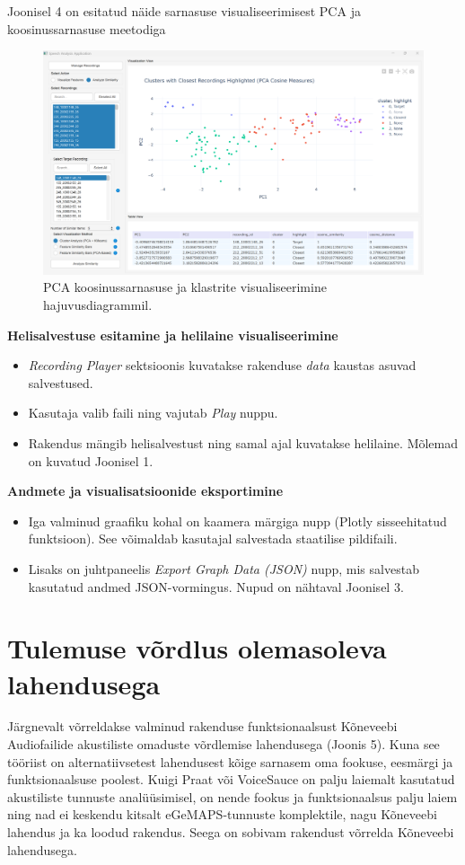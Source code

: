 Joonisel 4 on esitatud näide sarnasuse visualiseerimisest PCA ja koosinussarnasuse meetodiga

\begin{figure}[H]
    \centering
    \includegraphics[width=\textwidth]{figures/rakenduse-sarnasus-cluster-closest.png}
    \caption{PCA koosinussarnasuse ja klastrite visualiseerimine hajuvusdiagrammil.}
    \label{fig:rakenduse-sarnasus-cluster-closest}
\end{figure}

\textbf{Helisalvestuse esitamine ja helilaine visualiseerimine}

\begin{itemize}
    \item \textit{Recording Player} sektsioonis kuvatakse rakenduse \textit{data} kaustas asuvad salvestused.
    \item Kasutaja valib faili ning vajutab \textit{Play} nuppu.
    \item Rakendus mängib helisalvestust ning samal ajal kuvatakse helilaine. Mõlemad on kuvatud Joonisel 1.
\end{itemize}

\textbf{Andmete ja visualisatsioonide eksportimine}
\begin{itemize}
    \item Iga valminud graafiku kohal on kaamera märgiga nupp (Plotly sisseehitatud funktsioon). See võimaldab kasutajal salvestada staatilise pildifaili.
    \item Lisaks on juhtpaneelis \textit{Export Graph Data (JSON)} nupp, mis salvestab kasutatud andmed JSON-vormingus. Nupud on nähtaval Joonisel 3.
\end{itemize}

\section{Tulemuse võrdlus olemasoleva lahendusega}
Järgnevalt võrreldakse valminud rakenduse funktsionaalsust Kõneveebi Audiofailide akustiliste omaduste võrdlemise lahendusega (Joonis 5). Kuna see tööriist on alternatiivsetest lahendusest kõige sarnasem oma fookuse, eesmärgi ja funktsionaalsuse poolest. Kuigi Praat või VoiceSauce on palju laiemalt kasutatud akustiliste tunnuste analüüsimisel, on nende fookus ja funktsionaalsus palju laiem ning nad ei keskendu kitsalt eGeMAPS-tunnuste komplektile, nagu Kõneveebi lahendus ja ka loodud rakendus. Seega on sobivam rakendust võrrelda Kõneveebi lahendusega.


